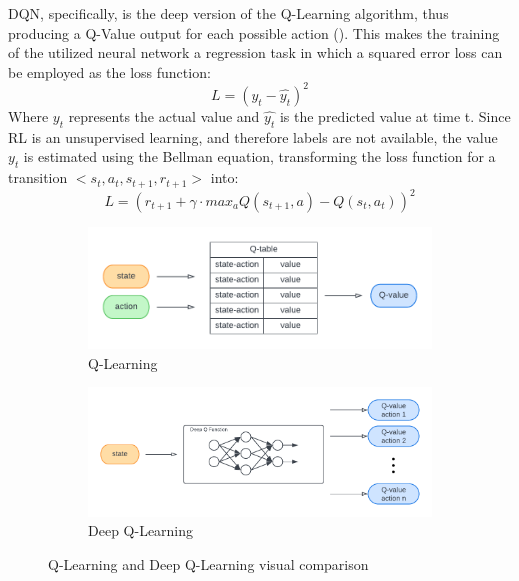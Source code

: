\documentclass[12pt,a4paper,openright,twoside]{book}
\begin{document}
DQN, specifically, is the deep version of the Q-Learning algorithm, thus producing a Q-Value output for each 
    possible action (). This makes the training of the utilized neural network a regression task 
    in which a squared error loss can be employed as the loss function:
    $$ L = (y_t - \hat{y_t})^2 $$
    Where $y_t$ represents the actual value and $\hat{y_t}$ is the predicted value at time t. Since RL is an 
    unsupervised learning, and therefore labels are not available, the value $y_t$ is estimated using the 
    Bellman equation, transforming the loss function for a transition $<s_t, a_t, s_{t+1}, r_{t+1}>$ into:
    $$ L = ( r_{t+1} + \gamma \cdot max_a Q(s_{t+1}, a) - Q(s_t, a_t))^2 $$

\begin{figure}[t]
    \begin{subfigure}[b]{0.49\textwidth}
        \centering
        \includegraphics[width=\textwidth]{figures/q-learning.pdf}
        \caption{Q-Learning}
        \label{fig:ql}
    \end{subfigure}
    \begin{subfigure}[b]{0.49\textwidth}
        \centering
        \includegraphics[width=\textwidth]{figures/deepQL.pdf}
        \caption{Deep Q-Learning}
        \label{fig:dqn}
    \end{subfigure}
\caption{Q-Learning and Deep Q-Learning visual comparison}\vspace{-10pt}
\label{fig:qlvsdqn}
\end{figure}
\end{document}

